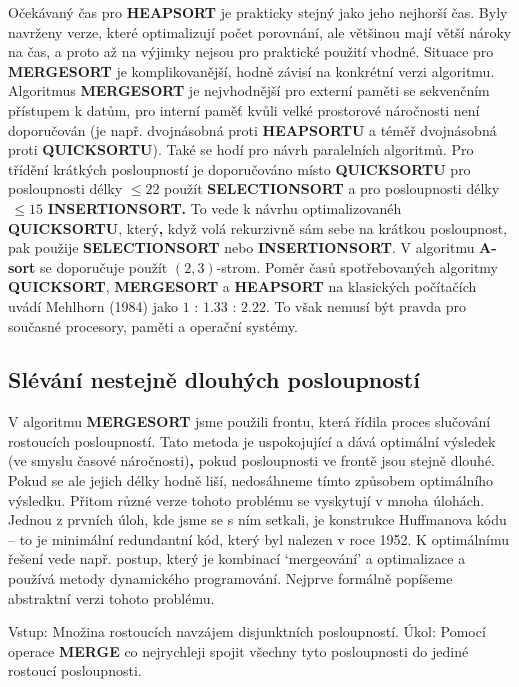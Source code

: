 \documentclass[a4paper,12pt]{article}
\begin{document}
Očekávaný čas pro {\bf HEAPSORT} je prakticky stejný jako 
jeho nej\-horší čas.  Byly navrženy verze, které optimalizují 
počet porov\-nání, ale většinou mají větší nároky na 
čas, a proto až na výjimky ne\-jsou pro praktické 
použití vhodné.  
Situace pro {\bf MERGESORT} je komplikovanější, hod\-ně závisí 
na konkrétní verzi algoritmu.  Algoritmus 
{\bf MER\-GE\-SORT} je nejvhodnější pro externí paměti se  
sekvenčním přístupem k datům, pro interní 
paměť kvůli velké prostorové náročnosti 
není doporučován (je např. dvojnásobná proti {\bf HEAPSORTU }
a téměř dvojnásobná proti {\bf QUICKSORTU}). Také se hodí pro 
návrh pa\-ra\-lelních algoritmů. Pro třídění 
krátkých posloupností je doporučováno místo {\bf QUICKSORTU }
pro posloupnosti délky $\le 22$ použít {\bf SELECTIONSORT} a pro 
posloupnosti délky $\,\le 15$  {\bf INSERTIONSORT.}
To vede k návrhu optimalizovanéh {\bf QUICKSORTU}, 
který{\bf ,}  když 
volá rekurzivně sám sebe na krátkou posloupnost, pak 
použije {\bf SELECTIONSORT} ne\-bo {\bf INSERTIONSORT}. V algoritmu {\bf A-sort }
se doporu\-ču\-je použít $(2,3)$-strom.  
Poměr časů spotřebovaných  
algoritmy {\bf QUICKSORT},  {\bf MERGESORT} a {\bf HEAPSORT} na 
klasických počítačích uvádí Mehlhorn (1984) jako  
$1$ : $1.33$ : $2.22$. To 
však nemusí  být pravda pro současné procesory, 
paměti a operační systémy. 

\subsection{
Slévání nestejně dlouhých posloupností
}

V algoritmu {\bf MERGESORT} jsme použili frontu, která 
řídila proces slučování rostoucích posloupností.  Tato metoda je uspokojující a 
dává optimální výsledek (ve smyslu časové náročnosti){\bf ,} pokud posloupnosti ve frontě jsou 
stejně dlouhé.  Pokud se ale jejich délky hodně liší, 
nedosáhneme tímto způsobem  
optimálního výsledku.  Přitom různé verze tohoto 
problému se vyskytují v mnoha úlohách. Jednou z prvních úloh, 
kde jsme se s ním setkali, je konstrukce 
Huffmanova k\'odu -- to je minimální redundantní k\'od, který byl 
nalezen v roce 1952. K optimálnímu řešení vede např. 
postup, který je kombinací `mergeování' a 
optimalizace a používá metody dynamického programování.  
Nejprve formálně popíšeme abstraktní verzi tohoto problému.  

Vstup: Množina rostoucích navzájem 
disjunktních posloupností.\newline 
Úkol:  Pomocí operace {\bf MERGE} co nejrychleji spojit 
všechny tyto posloupnosti do jediné rostoucí posloupnosti.  
\end{document}
